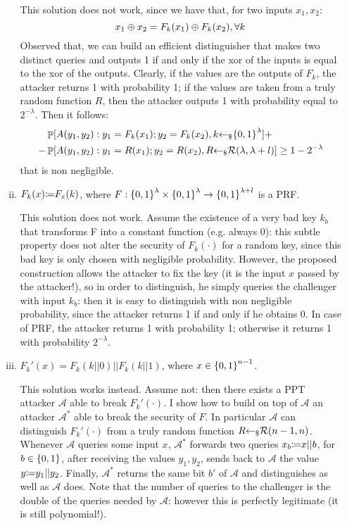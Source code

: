 \begin{enumerate}[(a)]
\begin{enumerate}[(i)]
		\begin{solution}
			This solution does not work, since we have that, for two inputs $x_1, x_2$:
			\[x_1 \oplus x_2 = F_k(x_1) \oplus F_k(x_2), \forall k\]
			Observed that, we can build an efficient distinguisher that makes two distinct queries and outputs 1 if and only if the xor of the inputs is equal to the xor of the outputs. Clearly, if the values are the outputs of $F_k$, the attacker returns 1 with probability 1; if the values are taken from a truly random function $R$, then the attacker outputs 1 with probability equal to $2^{-\lambda}$.
			Then it follows:
			\begin{align*}
			&\mathop{\mathbb P}[A(y_1, y_2): y_1 = F_k(x_1); y_2 = F_k(x_2), k {\leftarrow_\$} {\{0, 1\}}^\lambda] + \\
			- &\mathop{\mathbb P}[A(y_1, y_2): y_1 = R(x_1); y_2 = R(x_2), R {\leftarrow_\$} \mathcal{R}(\lambda, \lambda + l)] \ge 1 - 2^{-\lambda}
			\end{align*}
		that is non negligible.
		\end{solution}
		
		\item $F_k(x) {\coloneqq} F_x(k)$, where $F: {\{0, 1\}}^\lambda \times {\{0, 1\}}^\lambda \to {\{0, 1\}}^{\lambda + l}$ is a PRF.
		
		\begin{solution}
			This solution does not work. Assume the existence of a very bad key $k_b$ that transforms F into a constant function (e.g. always 0): this subtle property does not alter the security of $F_k(\cdot)$ for a random key, since this bad key is only chosen with negligible probability. However, the proposed construction allows the attacker to fix the key (it is the input $x$ passed by the attacker!), so in order to distinguish, he simply queries the challenger with input $k_b$: then it is easy to distinguish with non negligible probability, since the attacker returns 1 if and only if he obtains 0. In case of PRF, the attacker returns 1 with probability 1; otherwise it returns 1 with probability $2^{-\lambda}$.
		\end{solution}
		
		\item $F_k'(x) = F_k(k||0) || F_k(k||1)$, where $x \in {\{0, 1\}}^{n - 1}$.

		\begin{solution}
			This solution works instead. Assume not: then there exists a PPT attacker $\mathcal{A}$ able to break $F_k'(\cdot)$. I show how to build on top of $\mathcal{A}$ an attacker $\mathcal{A}^*$ able to break the security of $F$. In particular $\mathcal{A}$ can distinguish $F_k'(\cdot)$ from a truly random function $R {\leftarrow_\$} \mathcal{R}(n-1, n)$. Whenever $\mathcal{A}$ queries some input $x$, $\mathcal{A}^*$ forwards two queries $x_b{\coloneqq} x || b$, for $b \in {\{0, 1\}}$, after receiving the values $y_1, y_2$, sends back to $\mathcal{A}$ the value $y{\coloneqq} y_1 || y_2$.
			Finally, $\mathcal{A}^*$ returns the same bit $b'$ of $\mathcal{A}$ and distinguishes as well as $\mathcal{A}$ does. Note that the number of queries to the challenger is the double of the queries needed by $\mathcal{A}$: however this is perfectly legitimate (it is still polynomial!).		
		\end{solution}
	

\end{enumerate}
\end{enumerate}
